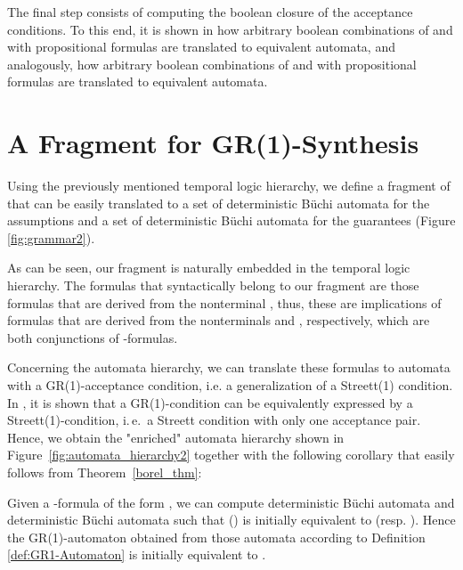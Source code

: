 \documentclass[submission,copyright,creativecommons]{eptcs}
\newcommand{\ie}{i.\,e.~}
\begin{document}
The final step consists of computing the boolean closure of the acceptance conditions. To this end, it is shown in \cite{Schn03} how arbitrary boolean combinations of  and  with propositional formulas  are translated to equivalent  automata, and analogously, how arbitrary boolean combinations of  and  with propositional formulas  are translated to equivalent  automata.




\begin{figure*}[!th] 
\caption{A \LTL{} Fragment for GR(1)-Synthesis}
\label{fig:grammar2}
\end{figure*}





\section{A \texorpdfstring{\LTL{}}{LTL} Fragment for GR(1)-Synthesis}

Using the previously mentioned temporal logic hierarchy, we define a fragment of \LTL{} that can be easily translated to a set of deterministic Büchi automata for the assumptions and a set of deterministic Büchi automata for the guarantees (Figure \ref {fig:grammar2}). 

As can be seen, our \LTL{} fragment is naturally embedded in the temporal logic hierarchy. The formulas that syntactically belong to our \LTL{} fragment are those formulas that are derived from the nonterminal , thus, these are implications of formulas that are derived from the nonterminals  and , respectively, which are both conjunctions of -formulas. 

\noindent Concerning the automata hierarchy, we can translate these formulas to automata with a GR(1)-acceptance condition, i.e. a generalization of a Streett(1) condition. In \cite{BCGH10}, it is shown that a GR(1)-condition can be equivalently expressed by a Streett(1)-condition, \ie a Streett condition with only one acceptance pair. Hence, we obtain the "enriched" automata hierarchy shown in Figure~\ref{fig:automata_hierarchy2} together with the following corollary that easily follows from Theorem~\ref{borel_thm}:

\begin{corollary}
Given a -formula of the form , we can compute  deterministic Büchi automata  and  deterministic Büchi automata  such that  () is initially equivalent to  (resp. ). Hence the GR(1)-automaton obtained from those automata according to Definition \ref{def:GR1-Automaton} is initially equivalent to .
\end{corollary}
\end{document}
